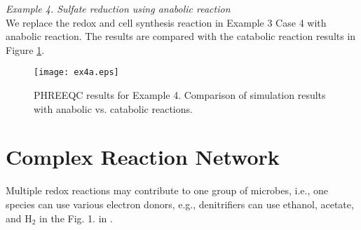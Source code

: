 \documentclass[12pt, a4paper]{article}
\begin{document}
\emph{Example 4. Sulfate reduction using anabolic reaction}\\
We replace the redox and cell synthesis reaction in Example 3 Case 4 with anabolic reaction. The results are compared with the catabolic reaction results in Figure \ref{Fig3}.

\begin{figure}[H]
\centering
\texttt{[image: ex4a.eps]}
\caption{PHREEQC results for Example 4. Comparison of simulation results with anabolic vs. catabolic reactions.}
\label{Fig3}
\end{figure}

\section{Complex Reaction Network}
Multiple redox reactions may contribute to one group of microbes, i.e., one species can use various electron donors, e.g., denitrifiers can use ethanol, acetate, and $\mathrm{H_2}$ in the Fig. 1. in \cite{Jin20111}.






\clearpage
%


\end{document}
